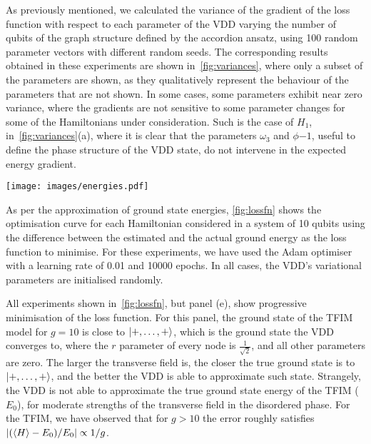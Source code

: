 \documentclass{ieeeaccess}
\begin{document}
As previously mentioned, we calculated the variance of the gradient of the loss function with respect to each parameter of the VDD varying the number of qubits of the graph structure defined by the accordion ansatz, using 100 random parameter vectors with different random seeds.
The corresponding results obtained in these experiments are shown in~\cref{fig:variances}, where only a subset of the parameters are shown, as they qualitatively represent the behaviour of the parameters that are not shown.
In some cases, some parameters exhibit near zero variance, where the gradients are not sensitive to some parameter changes for some of the Hamiltonians under consideration.
Such is the case of $H_1$, in~\cref{fig:variances}(a), where it is clear that the parameters $\omega_3$ and $\phi{-1}$, useful to define the phase structure of the VDD state, do not intervene in the expected energy gradient.

\begin{figure*}[h]
    \centering
    \texttt{[image: images/energies.pdf]}
    \caption{Percentual energy error curves as a function of the epoch number for a system with 10 qubits for the following Hamiltonians: a) $Z_1Z_2$, b) Heisenberg with $J_x=J_y=J_z=1.0$, c) TFIM with $g=0.0$ (ordered phase), d) TFIM with $g=1.0$ (gapless phase) and e) TFIM with $g=10.0$ (disordered phase). The optimised loss function is the difference between the expected value of the corresponding Hamiltonian and its ground state energy. $E_0$ is the true ground energy of each Hamiltonian.}
    \label{fig:lossfn}
\end{figure*}

As per the approximation of ground state energies, \cref{fig:lossfn} shows the optimisation curve for each Hamiltonian considered in a system of 10 qubits using the difference between the estimated and the actual ground energy as the loss function to minimise.
For these experiments, we have used the Adam \cite{kingma2017adam} optimiser with a learning rate of 0.01 and 10000 epochs.
In all cases, the VDD's variational parameters are initialised randomly.

All experiments shown in~\cref{fig:lossfn}, but panel (e), show progressive minimisation of the loss function.
For this panel, the ground state of the TFIM model for $g=10$ is close to $\ket{+,\ldots,+}$, which is the ground state the VDD converges to, where the $r$ parameter of every node is $\frac{1}{\sqrt{2}}$, and all other parameters are zero.
The larger the transverse field is, the closer the true ground state is to $\ket{+,\ldots,+}$, and the better the VDD is able to approximate such state.
Strangely, the VDD is not able to approximate the true ground state energy of the TFIM ($E_0$), for moderate strengths of the transverse field in the disordered phase.
For the TFIM, we have observed that for $g>10$ the error roughly satisfies $\abs{(\expval{H}-E_0)/E_0}\propto{1/g}$.
\end{document}
